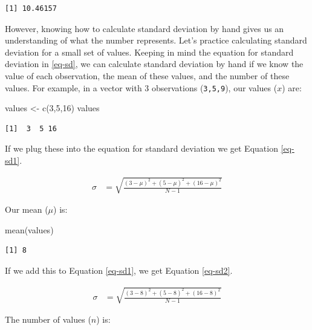 \documentclass[
  letterpaper,
  DIV=11,
  numbers=noendperiod]{scrartcl}
\newenvironment{Shaded}{\begin{snugshade}}{\end{snugshade}}
\newcommand{\DecValTok}[1]{\textcolor[rgb]{0.68,0.00,0.00}{#1}}
\newcommand{\FunctionTok}[1]{\textcolor[rgb]{0.28,0.35,0.67}{#1}}
\newcommand{\NormalTok}[1]{\textcolor[rgb]{0.00,0.23,0.31}{#1}}
\newcommand{\OtherTok}[1]{\textcolor[rgb]{0.00,0.23,0.31}{#1}}
\begin{document}
\begin{verbatim}
[1] 10.46157
\end{verbatim}

However, knowing how to calculate standard deviation by hand gives us an
understanding of what the number represents. Let's practice calculating
standard deviation for a small set of values. Keeping in mind the
equation for standard deviation in \ref{eq-sd}, we can calculate
standard deviation by hand if we know the value of each observation, the
mean of these values, and the number of these values. For example, in a
vector with 3 observations (\texttt{3,5,9}), our values (\(x\)) are:

\begin{Shaded}
\begin{Highlighting}[]
\NormalTok{values }\OtherTok{\textless{}{-}} \FunctionTok{c}\NormalTok{(}\DecValTok{3}\NormalTok{,}\DecValTok{5}\NormalTok{,}\DecValTok{16}\NormalTok{)}
\NormalTok{values}
\end{Highlighting}
\end{Shaded}

\begin{verbatim}
[1]  3  5 16
\end{verbatim}

If we plug these into the equation for standard deviation we get
Equation \ref{eq-sd1}.

\begin{align}
\sigma & = \sqrt{\frac{(3-\mu)^2 + (5-\mu)^2 + (16-\mu)^2}{N-1}} \label{eq-sd1}
\end{align}

Our mean (\(\mu\)) is:

\begin{Shaded}
\begin{Highlighting}[]
\FunctionTok{mean}\NormalTok{(values)}
\end{Highlighting}
\end{Shaded}

\begin{verbatim}
[1] 8
\end{verbatim}

If we add this to Equation \ref{eq-sd1}, we get Equation \ref{eq-sd2}.

\begin{align}
\sigma & = \sqrt{\frac{(3-8)^2 + (5-8)^2 + (16-8)^2}{N-1}} \label{eq-sd2}
\end{align}

The number of values (\(n\)) is:
\end{document}
